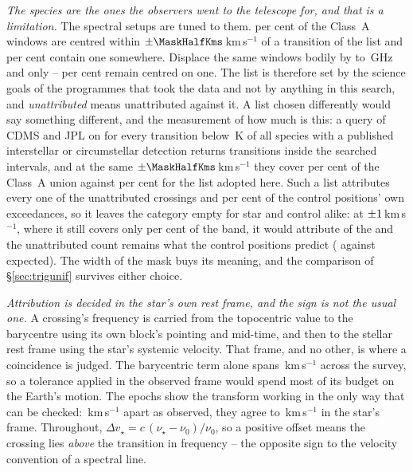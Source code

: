 \emph{The species are the ones the observers went to the telescope for, and
that is a limitation.} The spectral setups are tuned to them. \TnCenPct{} per
cent of the \NWinA{} Class~A windows are centred within
$\pm\MaskHalfKms$\,km\,s$^{-1}$ of a transition of the list and \TnWinPct{}
per cent contain one somewhere. Displace the same windows bodily by
\TnShiftLoGHz{} to \TnShiftHiGHz\,GHz and only
\TnCtrlCenLo--\TnCtrlCenHi{} per cent remain centred on one. The list is therefore set by the science goals of the programmes that took
the data and not by anything in this search, and \emph{unattributed} means
unattributed against it. A list chosen differently would say something
different, and the measurement of how much is this: a query of CDMS and JPL
\citep{Pickett1998,CDMS2005} on \XlQueryDate{} for every transition below
\XlEuMax\,K of all \XlNSpecies{} species with a published interstellar or
circumstellar detection returns \XlNTrans{} transitions inside the searched
intervals, and at the same $\pm\MaskHalfKms$\,km\,s$^{-1}$ they cover
\XlBandPct{} per cent of the Class~A union against \MkMaskAPct{} per
cent for the list adopted here. Such a list attributes every one of the
\MkUnattr{} unattributed crossings and \XlShareWidePct{} per cent of the
control positions' own exceedances, so it leaves the category empty for star
and control alike: at $\pm1$\,km\,s$^{-1}$, where it still covers
only \XlTightBandPct{} per cent of the band, it would attribute
\XlTightNIn{} of the \MkUnattr{} and the unattributed count remains what the
control positions predict (\XlTightObs{} against \XlTightExp{} expected).
The width of the mask buys its meaning, and the comparison of
\S\ref{sec:trigunif} survives either choice.

\emph{Attribution is decided in the star's own rest frame, and the sign is
not the usual one.} A crossing's frequency is carried from the topocentric
value to the barycentre using its own block's pointing and mid-time, and then
to the stellar rest frame using the star's systemic velocity. That frame, and
no other, is where a coincidence is judged.
The barycentric term alone spans \FrBarySwing\,km\,s$^{-1}$ across the
survey, so a tolerance applied in the observed frame would spend most of its
budget on the Earth's motion. The \FrEpochNEpoch{} \FrEpochStar{} epochs show
the transform working in the only way that can be checked:
\FrEpochTopoKms\,km\,s$^{-1}$ apart as observed, they agree to
\FrEpochStelKms\,km\,s$^{-1}$ in the star's frame.
Throughout, $\Delta v_\star = c\,(\nu_\star-\nu_0)/\nu_0$, so a positive
offset means the crossing lies \emph{above} the transition in frequency --
the opposite sign to the velocity convention of a spectral line.

